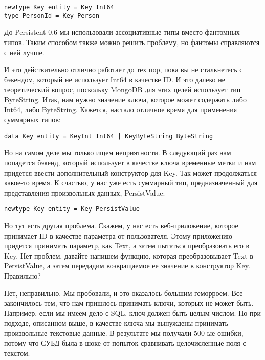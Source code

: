 \begin{lstlisting}
newtype Key entity = Key Int64
type PersonId = Key Person
\end{lstlisting}

\begin{remark}
До Persistent 0.6 мы использовали ассоциативные типы вместо фантомных типов. Таким способом также можно решить проблему, но фантомы справляются с ней лучше.
\end{remark}

И это действительно отлично работает до тех пор, пока вы не сталкнетесь с бэкендом, который не использует Int64 в качестве ID. И это далеко не теоретический вопрос, поскольку MongoDB для этих целей использует тип ByteString. Итак, нам нужно значение ключа, которое может содержать либо Int64, либо ByteString. Кажется, настало отличное время для применения суммарных типов:

\begin{lstlisting}
data Key entity = KeyInt Int64 | KeyByteString ByteString
\end{lstlisting}

Но на самом деле мы только ищем неприятности. В следующий раз нам попадется бэкенд, который использует в качестве ключа временные метки и нам придется ввести дополнительный конструктор для Key. Так может продолжаться какое-то время. К счастью, у нас уже есть суммарный тип, предназначенный для представления произвольных данных, PersistValue:

\begin{lstlisting}
newtype Key entity = Key PersistValue
\end{lstlisting}

Но тут есть другая проблема. Скажем, у нас есть веб-приложение, которое принимает ID в качестве параметра от пользователя. Этому приложению придется принимать параметр, как Text, а затем пытаться преобразовать его в Key. Нет проблем, давайте напишем функцию, которая преобразовывает Text в PersistValue, а затем передадим возвращаемое ее значение в конструктор Key. Правильно?

Нет, неправильно. Мы пробовали, и это оказалось большим геморроем. Все закончилось тем, что нам пришлось принимать ключи, которых не может быть. Например, если мы имеем дело с SQL, ключ должен быть целым числом. Но при подходе, описанном выше, в качестве ключа мы вынуждены принимать произвольные текстовые данные. В результате мы получали 500-ые ошибки, потому что СУБД была в шоке от попыток сравнивать целочисленные поля с текстом.

